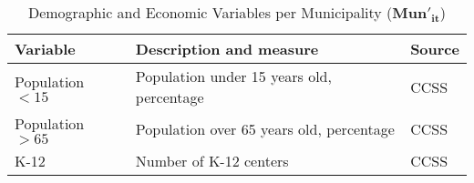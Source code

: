 
\begin{table}[ht]
\caption{Demographic and Economic Variables per Municipality ($\mathbf{Mun'_{it}}$)}
\centering
\begin{tabular}{l l l}
\hline
\hline
Variable & Description and measure & Source \\ [0.5ex] 
\hline
Population $< 15$ & Population under 15 years old, percentage & CCSS \\
Population $> 65$ & Population over 65 years old, percentage & CCSS \\
K-12 & Number of K-12 centers & CCSS \\
\hline
\hline
\end{tabular}
\label{table:demoecon}
\end{table}

